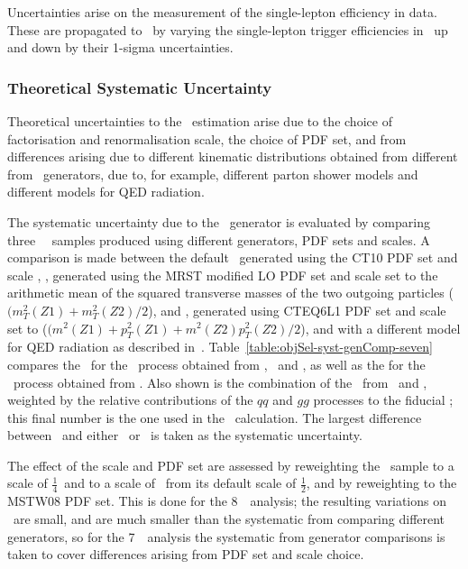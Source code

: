 Uncertainties arise on the measurement of the single-lepton efficiency in data.
These are propagated to \CZZ\ by varying the single-lepton trigger efficiencies
in~ up and down by their 1-sigma uncertainties.

\subsubsection{Theoretical Systematic Uncertainty}

Theoretical uncertainties to the \CZZ\ estimation arise due to the choice of
factorisation and renormalisation scale, the choice of PDF set, and from differences
arising due to different kinematic distributions obtained from different from \mc\
generators, due to, for example, different parton shower models and different
models for QED radiation.

The systematic uncertainty due to the \mc\ generator is evaluated by comparing
three \qqZZ\ \mc\ samples produced using different generators, PDF sets and
scales. A comparison is made between the default \powhegbox\ generated using the
CT10 PDF set and scale \mZZ, \pythia, generated using the MRST modified LO PDF
set and scale set to the arithmetic mean of the squared transverse masses of the
two outgoing particles ($(m^{2}_{T}(Z1)+m^{2}_{T}(Z2)/2$), and \sherpa,
generated using CTEQ6L1 PDF set and scale set to
($(m^{2}_{}(Z1)+p^{2}_{T}(Z1)+m^{2}_{}(Z2)p^{2}_{T}(Z2)/2$), and with a
different model for QED radiation as described in~\sec{gen-comparisons}.
Table~\ref{table:objSel-syst-genComp-seven} compares the \CZZ\ for the \qqZZ\
process obtained from \powhegbox, \sherpa\ and \pythia, as well as the for the
\ggZZ\ process obtained from \ggtwoZZ. Also shown is the combination of the
\CZZ\ from \powhegbox\ and \ggtwoZZ, weighted by the relative contributions of
the $qq$ and $gg$ processes to the fiducial \cx; this final number is the one
used in the \cx\ calculation. The largest difference between \powhegbox\ and
either \pythia\ or \sherpa\ is taken as the systematic uncertainty.

The effect of the scale and PDF set are assessed by
reweighting the \powhegbox\ sample to a scale of $\frac{1}{4}$\mZZ\ and to a
scale of \mZZ\ from its default scale of $\frac{1}{2}$\mZZ, and by reweighting
to the MSTW08 PDF set. This is done for the 8~\tev\ analysis; the resulting
variations on \CZZ\ are small, and are much smaller than the systematic from comparing
different generators, so for the 7~\tev\ analysis the systematic from generator
comparisons is taken to cover differences arising from PDF set and scale choice.

